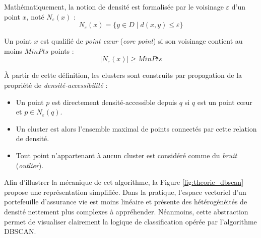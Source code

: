 Mathématiquement, la notion de densité est formalisée par le voisinage $\varepsilon$ d'un point $x$, noté $N_\varepsilon(x)$ :
\begin{equation}
    N_\varepsilon(x) = \{ y \in D \mid d(x,y) \le \varepsilon \}
\end{equation}

Un point $x$ est qualifié de \textit{point cœur} (\textit{core point}) si son voisinage contient au moins $MinPts$ points :
\begin{equation}
    |N_\varepsilon(x)| \ge MinPts
\end{equation}

À partir de cette définition, les clusters sont construits par propagation de la propriété de \textit{densité-accessibilité} :
\begin{itemize}
    \item Un point $p$ est directement densité-accessible depuis $q$ si $q$ est un point cœur et $p \in N_\varepsilon(q)$.
    \item Un cluster est alors l'ensemble maximal de points connectés par cette relation de densité.
    \item Tout point n'appartenant à aucun cluster est considéré comme du \textit{bruit} (\textit{outlier}).
\end{itemize}

Afin d'illustrer la mécanique de cet algorithme, la Figure \ref{fig:theorie_dbscan} propose une représentation simplifiée. Dans la pratique, l'espace vectoriel d'un portefeuille d'assurance vie est moins linéaire et présente des hétérogénéités de densité nettement plus complexes à appréhender. Néanmoins, cette abstraction permet de visualiser clairement la logique de classification opérée par l'algorithme DBSCAN.

